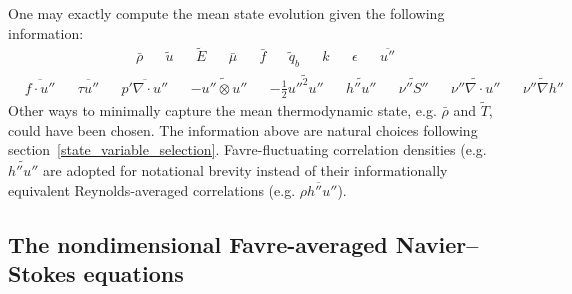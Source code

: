 \documentclass[letterpaper,11pt,nointlimits,reqno]{amsart}
\begin{document}
One may exactly compute the mean state evolution given the following
information:
\begin{align}
&\bar{\rho}
&
&\tilde{u}
&
&\tilde{E}
&
&\bar{\mu}
&
&\bar{f}
&
&\tilde{q}_b
&
&k
&
&\epsilon
&
&\overline{u''}
\end{align}
\begin{align}
&\overline{f\cdot{}u''}
&
&\overline{\tau{}u''}
&
&\overline{p'\nabla\cdot{}u''}
&
&-\widetilde{u''\otimes{}u''}
&
&-\frac{1}{2}\widetilde{{u''}^{2}u''}
&
&\widetilde{h''u''}
&
&\widetilde{\nu''S''}
&
&\widetilde{\nu''\nabla\cdot{}u''}
&
&\widetilde{\nu''\nabla{}h''}
\end{align}
Other ways to minimally capture the mean thermodynamic state, e.g. $\bar{\rho}$
and $\tilde{T}$, could have been chosen.  The information above are natural
choices following section~\ref{state_variable_selection}.  Favre-fluctuating
correlation densities (e.g.  $\widetilde{h''u''}$ are adopted for notational
brevity instead of their informationally equivalent Reynolds-averaged
correlations (e.g.  $\overline{\rho{}h''u''}$).

\subsection{The nondimensional Favre-averaged Navier--Stokes equations}
\label{sec:nondimfans}
\end{document}
